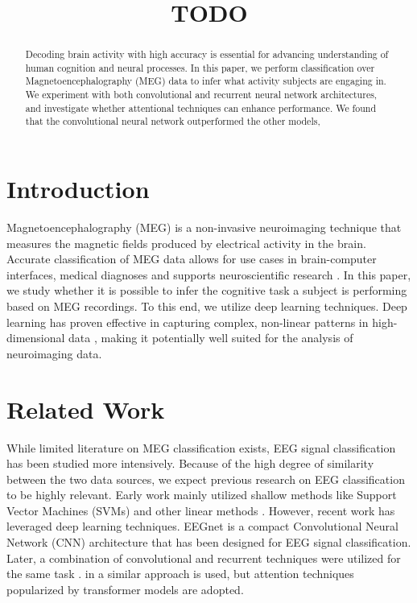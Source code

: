 \documentclass[conference]{IEEEtran}
\begin{document}
\title{TODO}

\author{
}

\maketitle

\begin{abstract}
Decoding brain activity with high accuracy is essential for advancing understanding of human cognition and 
neural processes. In this paper, we perform classification over Magnetoencephalography (MEG) data to infer what
activity subjects are engaging in. We experiment with both convolutional and recurrent neural network architectures, and
investigate whether attentional techniques can enhance performance. We found that the convolutional neural network outperformed
 the other models,




\end{abstract}

\section{Introduction}
Magnetoencephalography (MEG) is a non-invasive neuroimaging technique that measures the magnetic fields produced by electrical 
activity in the brain. Accurate classification of MEG data allows for use cases in brain-computer interfaces, medical diagnoses and
supports neuroscientific research \cite{belhadi2025eeg}. In this paper, we study whether it is possible to infer the cognitive task a subject is performing
based  on MEG recordings. To this end, we utilize deep learning techniques. Deep learning has proven effective in capturing complex, non-linear
 patterns in high-dimensional data \cite{lecun2015deep}, making it potentially well suited for the analysis of neuroimaging data. 

\section{Related Work}
While limited literature on MEG classification exists, EEG signal classification has been studied more intensively. Because of the
high degree of similarity between the two data sources, we expect previous research on EEG classification to be highly relevant.
Early work mainly utilized shallow methods like Support Vector Machines (SVMs) and other linear methods \cite{besserve2007classification}.
However, recent work \cite{lawhern2018eegnet} \cite{zhang2018cascade} \cite{abdellaoui2020deepbrainstateclassification}  has leveraged deep learning
techniques. EEGnet \cite{lawhern2018eegnet} is a compact Convolutional Neural Network (CNN) architecture  that has been designed for EEG signal classification. 
 Later, a combination of convolutional and recurrent techniques were utilized for the same task \cite{zhang2018cascade}. in \cite{abdellaoui2020deepbrainstateclassification} a similar approach is used,
but attention techniques popularized by transformer models \cite{vaswani2017attention} are adopted. 
\end{document}

